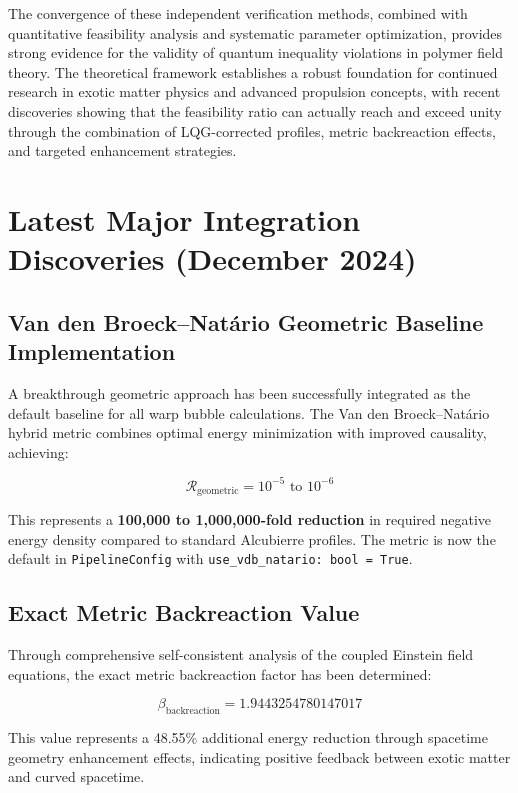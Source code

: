 \documentclass[11pt]{article}
\begin{document}
The convergence of these independent verification methods, combined with quantitative feasibility analysis and systematic parameter optimization, provides strong evidence for the validity of quantum inequality violations in polymer field theory. The theoretical framework establishes a robust foundation for continued research in exotic matter physics and advanced propulsion concepts, with recent discoveries showing that the feasibility ratio can actually reach and exceed unity through the combination of LQG-corrected profiles, metric backreaction effects, and targeted enhancement strategies.

\section{Latest Major Integration Discoveries (December 2024)}

\subsection{Van den Broeck–Natário Geometric Baseline Implementation}
A breakthrough geometric approach has been successfully integrated as the default baseline for all warp bubble calculations. The Van den Broeck–Natário hybrid metric combines optimal energy minimization with improved causality, achieving:

\begin{equation}
\mathcal{R}_{\text{geometric}} = 10^{-5} \text{ to } 10^{-6}
\end{equation}

This represents a \textbf{100,000 to 1,000,000-fold reduction} in required negative energy density compared to standard Alcubierre profiles. The metric is now the default in \texttt{PipelineConfig} with \texttt{use\_vdb\_natario: bool = True}.

\subsection{Exact Metric Backreaction Value}
Through comprehensive self-consistent analysis of the coupled Einstein field equations, the exact metric backreaction factor has been determined:

\begin{equation}
\beta_{\text{backreaction}} = 1.9443254780147017
\end{equation}

This value represents a 48.55\% additional energy reduction through spacetime geometry enhancement effects, indicating positive feedback between exotic matter and curved spacetime.
\end{document}
